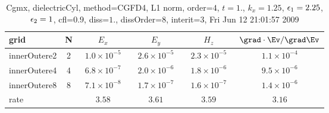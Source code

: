 \begin{table}[hbt]\tableFont %
\begin{center}
\begin{tabular}{|l|c|c|c|c|c|} \hline 
grid  & N &  $E_x$ &  $E_y$ & $H_z$ & $\grad\cdot\Ev/\grad\Ev$\\ \hline 
        innerOutere2 &     2 & ~$1.0\times10^{ -5}$~ & ~$2.6\times10^{ -5}$~ & ~$2.3\times10^{ -5}$~ & ~$1.1\times10^{ -4}$~  \\ \hline
        innerOutere4 &     4 & ~$6.8\times10^{ -7}$~ & ~$2.0\times10^{ -6}$~ & ~$1.8\times10^{ -6}$~ & ~$9.5\times10^{ -6}$~  \\ \hline
        innerOutere8 &     8 & ~$7.1\times10^{ -8}$~ & ~$1.7\times10^{ -7}$~ & ~$1.6\times10^{ -7}$~ & ~$1.4\times10^{ -6}$~  \\ \hline
    rate             &       &       $3.58$          &       $3.61$          &       $3.59$          &       $3.16$           \\ \hline
\end{tabular}
\caption{Cgmx, dielectricCyl, method=CGFD4, L1 norm, order=$4$, $t=1.$, $k_x=1.25$, $\epsilon_1=2.25$, $\epsilon_2=1$, cfl=$0.9$, diss=$1.$, dissOrder=$8$, interit=$3$, Fri Jun 12 21:01:57 2009}\label{table:dielectricCylNFDTDOrder4L1}
\end{center}
\end{table}
